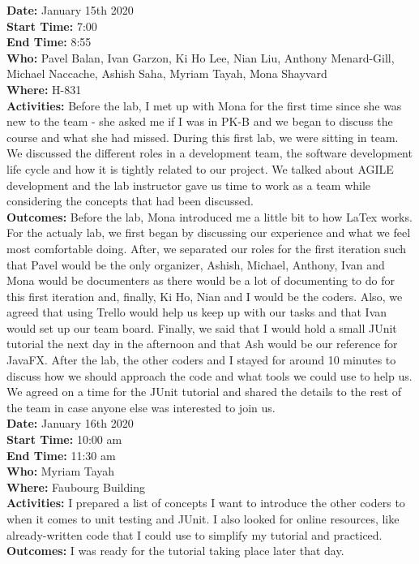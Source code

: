 \documentclass[12pt]{article}
\begin{document}
{\bf Date:} January 15th 2020\\
{\bf Start Time:} 7:00\\
{\bf End Time:} 8:55 \\
{\bf Who:} Pavel Balan, Ivan Garzon, Ki Ho Lee, Nian Liu, Anthony Menard-Gill, Michael Naccache, Ashish Saha, Myriam Tayah, Mona Shayvard\\
{\bf Where:} H-831 \\
{\bf Activities:} Before the lab, I met up with Mona for the first time since she was new to the team - she asked me if I was in PK-B and we began to discuss the course and what she had missed. During this first lab, we were sitting in team. We discussed the different roles in a development team, the software development life cycle and how it is tightly related to our project. We talked about AGILE development and the lab instructor gave us time to work as a team while considering the concepts that had been discussed. \\
{\bf Outcomes:} Before the lab, Mona introduced me a little bit to how LaTex works. For the actualy lab, we first began by discussing our experience and what we feel most comfortable doing. After, we separated our roles for the first iteration such that Pavel would be the only organizer, Ashish, Michael, Anthony, Ivan and Mona would be documenters as there would be a lot of documenting to do for this first iteration and, finally, Ki Ho, Nian and I would be the coders. Also, we agreed that using Trello would help us keep up with our tasks and that Ivan would set up our team board. Finally, we said that I would hold a small JUnit tutorial the next day in the afternoon and that Ash would be our reference for JavaFX. After the lab, the other coders and I stayed for around 10 minutes to discuss how we should approach the code and what tools we could use to help us. We agreed on a time for the JUnit tutorial and shared the details to the rest of the team in case anyone else was interested to join us. \\

{\bf Date:} January 16th 2020\\
{\bf Start Time:} 10:00 am\\
{\bf End Time:} 11:30 am \\
{\bf Who:} Myriam Tayah\\
{\bf Where:} Faubourg Building \\
{\bf Activities:} I prepared a list of concepts I want to introduce the other coders to when it comes to unit testing and JUnit. I also looked for online resources, like already-written code that I could use to simplify my tutorial and practiced.\\
{\bf Outcomes:} I was ready for the tutorial taking place later that day.\\
\end{document}
